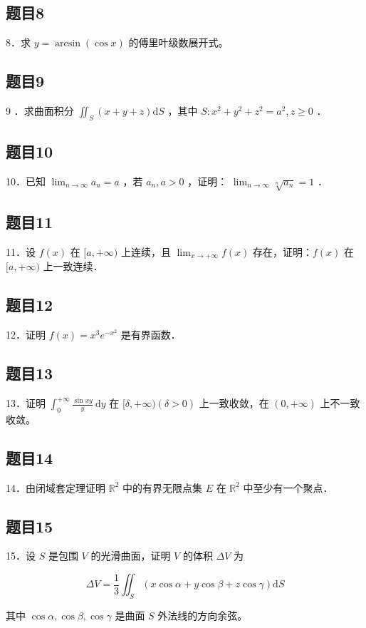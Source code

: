 \documentclass{article}
\begin{document}
\subsection{题目8}
8．求 \(y=\arcsin (\cos x)\) 的傅里叶级数展开式。

\subsection{题目9}
9 ．求曲面积分 \(\iint_{S}(x+y+z) \mathrm{d} S\) ，其中 \(S: x^{2}+y^{2}+z^{2}=a^{2}, z \geq 0\) ．

\subsection{题目10}
10．已知 \(\lim _{n \rightarrow \infty} a_{n}=a\) ，若 \(a_{n}, a>0\) ，证明： \(\lim _{n \rightarrow \infty} \sqrt[n]{a_{n}}=1\) ．

\subsection{题目11}
11．设 \(f(x)\) 在 \([a,+\infty)\) 上连续，且 \(\lim _{x \rightarrow+\infty} f(x)\) 存在，证明：\(f(x)\) 在 \([a,+\infty)\) 上一致连续．

\subsection{题目12}
12．证明 \(f(x)=x^{3} e^{-x^{2}}\) 是有界函数．

\subsection{题目13}
13．证明 \(\int_{0}^{+\infty} \frac{\sin x y}{y} \mathrm{~d} y\) 在 \([\delta,+\infty)(\delta>0)\) 上一致收敛，在 \((0,+\infty)\) 上不一致收敛。

\subsection{题目14}
14．由闭域套定理证明 \(\mathbb{R}^{2}\) 中的有界无限点集 \(E\) 在 \(\mathbb{R}^{2}\) 中至少有一个聚点．

\subsection{题目15}
15．设 \(S\) 是包围 \(V\) 的光滑曲面，证明 \(V\) 的体积 \(\Delta V\) 为

\[
\Delta V=\frac{1}{3} \iint_{S}(x \cos \alpha+y \cos \beta+z \cos \gamma) \mathrm{d} S
\]

其中 \(\cos \alpha, \cos \beta, \cos \gamma\) 是曲面 \(S\) 外法线的方向余弦。
\end{document}
